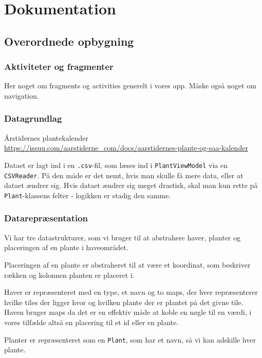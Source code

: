 \newpage
\section{Dokumentation}

\subsection{Overordnede opbygning}

\subsubsection{Aktiviteter og fragmenter}
Her noget om fragments og activities generelt i vores app. Måske også noget om navigation.

\subsubsection{Datagrundlag}
Årstidernes plantekalender \hyperlink{https://issuu.com/aarstiderne\_com/docs/aarstidernes-plante-og-saa-kalender}{https://issuu.com/aarstiderne\_com/docs/aarstidernes-plante-og-saa-kalender}


Dataet er lagt ind i en \texttt{.csv}-fil, som læses ind i \texttt{PlantViewModel} via en \texttt{CSVReader}. På den måde er det nemt, hvis man skulle få mere data, eller at dataet ændrer sig. Hvis dataet ændrer sig meget drastisk, skal man kun rette på \texttt{Plant}-klassens felter - logikken er stadig den samme.

\subsubsection{Datarepræsentation}

Vi har tre datastrukturer, som vi bruger til at abstrahere haver, planter og placeringen af en plante i haveområdet.

Placeringen af en plante er abstraheret til at være et koordinat, som beskriver rækken og kolonnen planten er placeret i.

Haver er repræsenteret med en type, et navn og to maps, der hver repræsenterer hvilke tiles der ligger hvor og hvilken plante der er plantet på det givne tile.
Haven bruger maps da det er en effektiv måde at koble en nøgle til en værdi, i vores tilfælde altså en placering til et id eller en plante.

Planter er repræsenteret som en \texttt{Plant}, som har et navn, så vi kan adskille hver plante.

